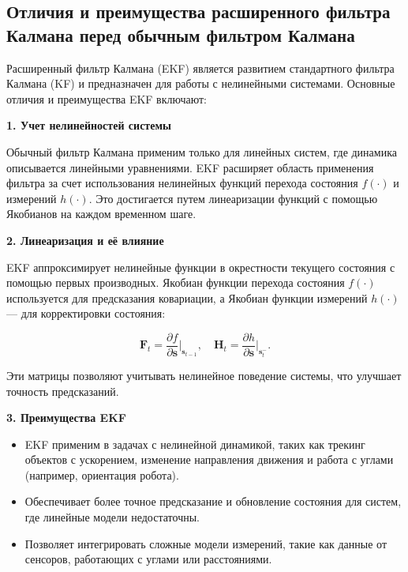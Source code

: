 \subsection{Отличия и преимущества расширенного фильтра Калмана перед обычным фильтром Калмана}

Расширенный фильтр Калмана (EKF) является развитием стандартного фильтра Калмана (KF) и предназначен для работы с нелинейными системами. Основные отличия и преимущества EKF включают:

\textbf{1. Учет нелинейностей системы}

Обычный фильтр Калмана применим только для линейных систем, где динамика описывается линейными уравнениями. EKF расширяет область применения фильтра за счет использования нелинейных функций перехода состояния $f(\cdot)$ и измерений $h(\cdot)$. Это достигается путем линеаризации функций с помощью Якобианов на каждом временном шаге.

\textbf{2. Линеаризация и её влияние}

EKF аппроксимирует нелинейные функции в окрестности текущего состояния с помощью первых производных. Якобиан функции перехода состояния $f(\cdot)$ используется для предсказания ковариации, а Якобиан функции измерений $h(\cdot)$ — для корректировки состояния:

\begin{equation}
    \mathbf{F}_t = \frac{\partial f}{\partial \mathbf{s}} \big|_{\mathbf{s}_{t-1}}, \quad \mathbf{H}_t = \frac{\partial h}{\partial \mathbf{s}} \big|_{\mathbf{s}_t^-}.
\end{equation}

Эти матрицы позволяют учитывать нелинейное поведение системы, что улучшает точность предсказаний.

\textbf{3. Преимущества EKF}

\begin{itemize}

    \item EKF применим в задачах с нелинейной динамикой, таких как трекинг объектов с ускорением, изменение направления движения и работа с углами (например, ориентация робота).

    \item Обеспечивает более точное предсказание и обновление состояния для систем, где линейные модели недостаточны.

    \item Позволяет интегрировать сложные модели измерений, такие как данные от сенсоров, работающих с углами или расстояниями.
\end{itemize}

